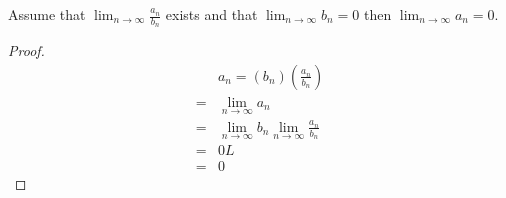 \begin{prop}
Assume that $\lim_{n\to\infty} \frac{a_n}{b_n}$ exists and that $\lim_{n\to\infty} b_n = 0$ then $\lim_{n\to\infty} a_n = 0$.
\end{prop}
\begin{proof}
\begin{align*}
    & a_n = (b_n)(\frac{a_n}{b_n})\\
    =&  \lim_{n\to\infty} a_n \\
    = & \lim_{n\to\infty} b_n \lim_{n\to\infty} \frac{a_n}{b_n} \\
    =& 0 L\\
    = & 0
\end{align*}



\end{proof}




